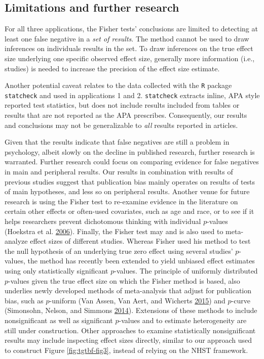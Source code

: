 \documentclass[a5paper]{book}
\begin{document}
\subsection{Limitations and further
research}\label{limitations-and-further-research}

For all three applications, the Fisher tests' conclusions are limited to
detecting at least one false negative in a \emph{set of results}. The
method cannot be used to draw inferences on individuals results in the
set. To draw inferences on the true effect size underlying one specific
observed effect size, generally more information (i.e., studies) is
needed to increase the precision of the effect size estimate.

Another potential caveat relates to the data collected with the
\texttt{R} package \texttt{statcheck} and used in applications 1 and 2.
\texttt{statcheck} extracts inline, APA style reported test statistics,
but does not include results included from tables or results that are
not reported as the APA prescribes. Consequently, our results and
conclusions may not be generalizable to \emph{all} results reported in
articles.

Given that the results indicate that false negatives are still a problem
in psychology, albeit slowly on the decline in published research,
further research is warranted. Further research could focus on comparing
evidence for false negatives in main and peripheral results. Our results
in combination with results of previous studies suggest that publication
bias mainly operates on results of tests of main hypotheses, and less so
on peripheral results. Another venue for future research is using the
Fisher test to re-examine evidence in the literature on certain other
effects or often-used covariates, such as age and race, or to see if it
helps researchers prevent dichotomous thinking with individual
\(p\)-values (Hoekstra et al.
\protect\hyperlink{ref-doi:10.3758ux2fbf03213921}{2006}). Finally, the
Fisher test may and is also used to meta-analyze effect sizes of
different studies. Whereas Fisher used his method to test the null
hypothesis of an underlying true zero effect using several studies'
\(p\)-values, the method has recently been extended to yield unbiased
effect estimates using only statistically significant \(p\)-values. The
principle of uniformly distributed \(p\)-values given the true effect
size on which the Fisher method is based, also underlies newly developed
methods of meta-analysis that adjust for publication bias, such as
\(p\)-uniform (Van Assen, Van Aert, and Wicherts
\protect\hyperlink{ref-doi:10.1037ux2fmet0000025}{2015}) and \(p\)-curve
(Simonsohn, Nelson, and Simmons
\protect\hyperlink{ref-doi:10.1037ux2fa0033242}{2014}). Extensions of
these methods to include nonsignificant as well as significant
\(p\)-values and to estimate heterogeneity are still under construction.
Other approaches to examine statistically nonsignificant results may
include inspecting effect sizes directly, similar to our approach used
to construct Figure \ref{fig:tgtbf-fig3}, instead of relying on the NHST
framework.
\end{document}
